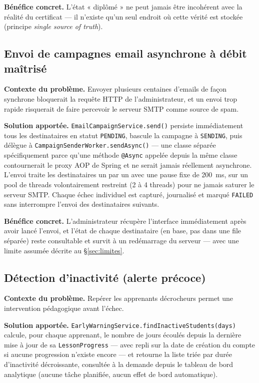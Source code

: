 \textbf{Bénéfice concret.} L'état « diplômé » ne peut jamais être
incohérent avec la réalité du certificat --- il n'existe qu'un seul endroit
où cette vérité est stockée (principe \emph{single source of truth}).

\subsection{Envoi de campagnes email asynchrone à débit maîtrisé}
\label{sec:campagne-email}

\textbf{Contexte du problème.} Envoyer plusieurs centaines d'emails de
façon synchrone bloquerait la requête HTTP de l'administrateur, et un
envoi trop rapide risquerait de faire percevoir le serveur SMTP comme
source de spam.

\textbf{Solution apportée.} \texttt{EmailCampaignService.send()} persiste
immédiatement tous les destinataires en statut \texttt{PENDING}, bascule la
campagne à \texttt{SENDING}, puis délègue à
\texttt{CampaignSenderWorker.sendAsync()} --- une classe séparée
spécifiquement parce qu'une méthode \texttt{@Async} appelée depuis la même
classe contournerait le proxy AOP de Spring et ne serait jamais réellement
asynchrone. L'envoi traite les destinataires un par un avec une pause fixe
de 200~ms, sur un pool de threads volontairement restreint (2 à 4 threads)
pour ne jamais saturer le serveur SMTP. Chaque échec individuel est
capturé, journalisé et marqué \texttt{FAILED} sans interrompre l'envoi des
destinataires suivants.

\textbf{Bénéfice concret.} L'administrateur récupère l'interface
immédiatement après avoir lancé l'envoi, et l'état de chaque destinataire
(en base, pas dans une file séparée) reste consultable et survit à un
redémarrage du serveur --- avec une limite assumée décrite au
\S\ref{sec:limites}.

\subsection{Détection d'inactivité (alerte précoce)}
\label{sec:early-warning}

\textbf{Contexte du problème.} Repérer les apprenants décrocheurs
permet une intervention pédagogique avant l'échec.

\textbf{Solution apportée.} \texttt{EarlyWarningService.findInactiveStudents(days)}
calcule, pour chaque apprenant, le nombre de jours écoulés depuis la
dernière mise à jour de sa \texttt{LessonProgress} --- avec repli sur la
date de création du compte si aucune progression n'existe encore --- et
retourne la liste triée par durée d'inactivité décroissante, consultée à
la demande depuis le tableau de bord analytique (aucune tâche planifiée,
aucun effet de bord automatique).

